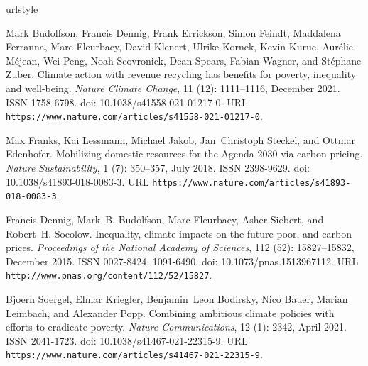 \documentclass[12pt,english]{article}
\begin{document}
\begin{thebibliography}{55}
  \providecommand{\natexlab}[1]{#1}
  \providecommand{\url}[1]{\texttt{#1}}
  \expandafter\ifx\csname urlstyle\endcsname\relax
    \providecommand{\doi}[1]{doi: #1}\else
    \providecommand{\doi}{doi: \begingroup \urlstyle{rm}\Url}\fi
  
  Mark Budolfson, Francis Dennig, Frank Errickson, Simon Feindt, Maddalena
    Ferranna, Marc Fleurbaey, David Klenert, Ulrike Kornek, Kevin Kuruc,
    Aur{\'e}lie M{\'e}jean, Wei Peng, Noah Scovronick, Dean Spears, Fabian
    Wagner, and St{\'e}phane Zuber.
  \newblock Climate action with revenue recycling has benefits for poverty,
    inequality and well-being.
  \newblock \emph{Nature Climate Change}, 11 (12): 1111--1116,
    December 2021.
  \newblock ISSN 1758-6798.
  \newblock \doi{10.1038/s41558-021-01217-0}.
  \newblock URL \url{https://www.nature.com/articles/s41558-021-01217-0}.
  
  Max Franks, Kai Lessmann, Michael Jakob, Jan~Christoph Steckel, and Ottmar
    Edenhofer.
  \newblock Mobilizing domestic resources for the {{Agenda}} 2030 via carbon
    pricing.
  \newblock \emph{Nature Sustainability}, 1 (7): 350--357, July
    2018.
  \newblock ISSN 2398-9629.
  \newblock \doi{10.1038/s41893-018-0083-3}.
  \newblock URL \url{https://www.nature.com/articles/s41893-018-0083-3}.
  
  Francis Dennig, Mark~B. Budolfson, Marc Fleurbaey, Asher Siebert, and Robert~H.
    Socolow.
  \newblock Inequality, climate impacts on the future poor, and carbon prices.
  \newblock \emph{Proceedings of the National Academy of Sciences}, 112
    (52): 15827--15832, December 2015.
  \newblock ISSN 0027-8424, 1091-6490.
  \newblock \doi{10.1073/pnas.1513967112}.
  \newblock URL \url{http://www.pnas.org/content/112/52/15827}.
  
  Bjoern Soergel, Elmar Kriegler, Benjamin~Leon Bodirsky, Nico Bauer, Marian
    Leimbach, and Alexander Popp.
  \newblock Combining ambitious climate policies with efforts to eradicate
    poverty.
  \newblock \emph{Nature Communications}, 12 (1): 2342, April
    2021.
  \newblock ISSN 2041-1723.
  \newblock \doi{10.1038/s41467-021-22315-9}.
  \newblock URL \url{https://www.nature.com/articles/s41467-021-22315-9}.
  

\end{thebibliography}
\end{document}

